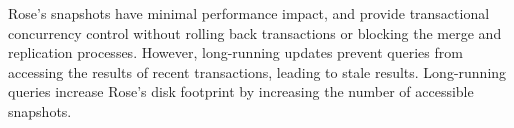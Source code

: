 \documentclass{vldb}
\newcommand{\rows}{Rose\xspace}
\newcommand{\rowss}{Rose's\xspace}
\begin{document}
\rowss snapshots have minimal performance impact, and provide
transactional concurrency control without rolling back transactions
or blocking the merge and replication processes.  However,
long-running updates prevent queries from accessing the results of
recent transactions, leading to stale results.  Long-running queries
increase \rowss disk footprint by increasing the number of accessible
snapshots.



\end{document}
